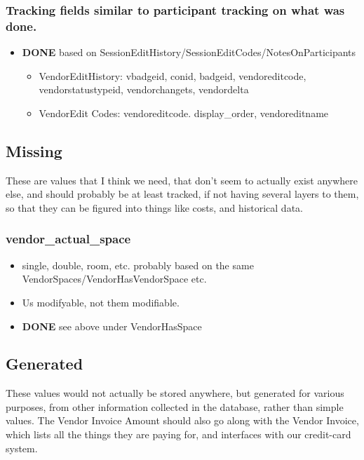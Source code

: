\documentclass[captions=tablesignature]{scrartcl}
\begin{document}
\subsubsection{Tracking fields similar to participant tracking on what was done.}
\label{sec-2-2-23}
\begin{itemize}
\item {\bfseries\sffamily DONE} based on SessionEditHistory/SessionEditCodes/NotesOnParticipants
\label{sec-2-2-23-1}
\begin{itemize}
\item VendorEditHistory: vbadgeid, conid, badgeid, vendoreditcode,
vendorstatustypeid, vendorchangets, vendordelta
\item VendorEdit Codes: vendoreditcode. display\_order, vendoreditname
\end{itemize}
\end{itemize}

\subsection{Missing}
\label{sec-2-3}
These are values that I think we need, that don't seem to actually
exist anywhere else, and should probably be at least tracked, if
not having several layers to them, so that they can be figured into
things like costs, and historical data.
\subsubsection{vendor\_actual\_space}
\label{sec-2-3-1}
\begin{itemize}
\item single, double, room, etc. probably based on the same
VendorSpaces/VendorHasVendorSpace etc.
\item Us modifyable, not them modifiable.
\end{itemize}
\begin{itemize}
\item {\bfseries\sffamily DONE} see above under VendorHasSpace
\label{sec-2-3-1-1}
\end{itemize}

\subsection{Generated}
\label{sec-2-4}
These values would not actually be stored anywhere, but generated
for various purposes, from other information collected in the
database, rather than simple values.  The Vendor Invoice Amount
should also go along with the Vendor Invoice, which lists all the
things they are paying for, and interfaces with our credit-card
system.
\end{document}
